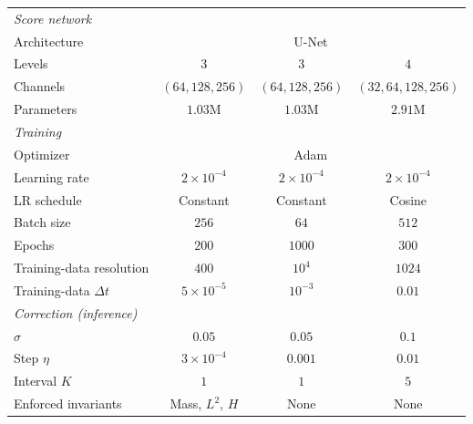 \documentclass[letterpaper]{article} %
\begin{document}
\begin{table}[h]
\begin{tabular}{l ccc}
\midrule
\multicolumn{4}{l}{\textit{Score network}}\\
Architecture         & \multicolumn{3}{c}{U-Net \citep{ronneberger2015u}} \\
Levels               & $3$ & $3$ & $4$ \\
Channels             & $(64,128,256)$ & $(64,128,256)$ & $(32,64,128,256)$ \\
Parameters           & $1.03$M & $1.03$M & $2.91$M \\
\midrule
\multicolumn{4}{l}{\textit{Training}}\\
Optimizer            & \multicolumn{3}{c}{Adam \citep{kingma2014adam}} \\
Learning rate        & $2{\times}10^{-4}$ & $2{\times}10^{-4}$ & $2{\times}10^{-4}$ \\
LR schedule          & Constant & Constant & Cosine \\
Batch size           & $256$ & $64$ & $512$ \\
Epochs               & $200$ & $1000$ & $300$ \\
Training-data resolution & $400$ & $10^{4}$ & $1024$ \\
Training-data $\Delta t$ & $5{\times}10^{-5}$ & $10^{-3}$ & $0.01$ \\

\midrule
\multicolumn{4}{l}{\textit{Correction (inference)}}\\
$\sigma$             & $0.05$ & $0.05$ & $0.1$ \\
Step $\eta$        & $3{\times}10^{-4}$ & $0.001$ & $0.01$ \\
Interval $K$         & $1$ & $1$ & $5$ \\
Enforced invariants  & Mass, $L^2$, $H$ & None & None \\


\end{tabular}
\end{table}
\end{document}
